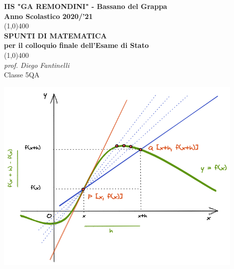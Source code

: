 \documentclass[11pt, landscape]{article}
\begin{document}
\begin{titlepage}
\begin{center}
\vspace*{1cm}
\Large{\textbf{IIS "GA REMONDINI" - Bassano del Grappa}}\\
\Large{\textbf{Anno Scolastico 2020/'21}}\\
\vfill
\line(1,0){400}\\[.5mm]
\huge{\textbf{SPUNTI DI MATEMATICA}}\\[3mm]
\Large{\textbf{per il colloquio finale dell'Esame di Stato}}\\
\line(1,0){400}\\
\vfill
{\em prof. Diego Fantinelli}\\
{Classe 5QA } \\

\end{center}
\end{titlepage}



\setcounter{page}{1}

\includegraphics[width=0.9\textwidth]{derivata_01.png}

\begin{figure}
\setlength{\fboxrule}{0.7pt}
\end{figure}
\end{document}
